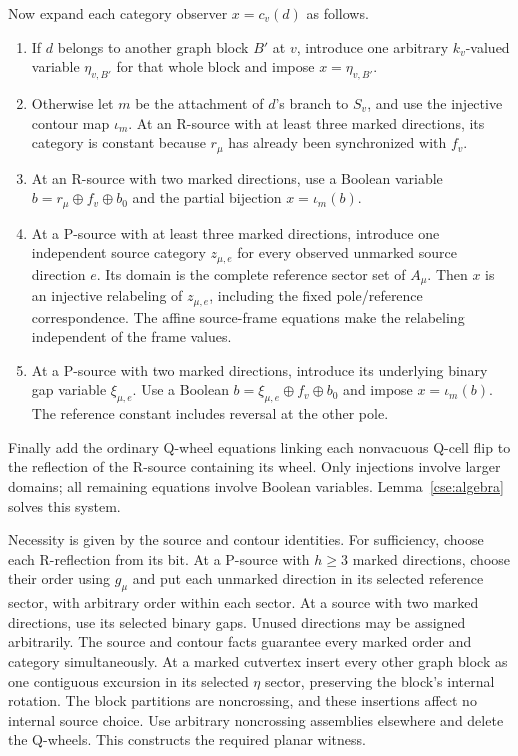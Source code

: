Now expand each category observer $x=c_v(d)$ as follows.
\begin{enumerate}
\item If $d$ belongs to another graph block $B'$ at $v$, introduce one
      arbitrary $k_v$-valued variable $\eta_{v,B'}$ for that whole block
      and impose $x=\eta_{v,B'}$.
\item Otherwise let $m$ be the attachment of $d$'s branch to $S_v$, and
      use the injective contour map $\iota_m$.
      At an R-source with at least three marked directions, its category
      is constant because $r_\mu$ has already been synchronized with
      $f_v$.
\item At an R-source with two marked directions, use a Boolean variable
      $b=r_\mu\oplus f_v\oplus b_0$ and the partial bijection
      $x=\iota_m(b)$.
\item At a P-source with at least three marked directions, introduce one
      independent source category $z_{\mu,e}$ for every observed
      unmarked source direction $e$. Its domain is the complete reference
      sector set of $A_\mu$. Then $x$ is an injective relabeling of
      $z_{\mu,e}$, including the fixed pole/reference correspondence.
      The affine source-frame equations make the relabeling independent
      of the frame values.
\item At a P-source with two marked directions, introduce its underlying
      binary gap variable $\xi_{\mu,e}$. Use a Boolean
      $b=\xi_{\mu,e}\oplus f_v\oplus b_0$ and impose
      $x=\iota_m(b)$. The reference constant includes reversal at the
      other pole.
\end{enumerate}
Finally add the ordinary Q-wheel equations linking each nonvacuous
Q-cell flip to the reflection of the R-source containing its wheel.
Only injections involve larger domains; all remaining equations involve
Boolean variables. Lemma~\ref{cse:algebra} solves this system.

Necessity is given by the source and contour identities. For sufficiency,
choose each R-reflection from its bit. At a P-source with $h\ge3$ marked
directions, choose their order using $g_\mu$ and put each unmarked
direction in its selected reference sector, with arbitrary order within
each sector. At a source with two marked directions, use its selected
binary gaps. Unused directions may be assigned arbitrarily. The source
and contour facts guarantee every marked order and category
simultaneously. At a marked cutvertex insert every other graph block as
one contiguous excursion in its selected $\eta$ sector, preserving the
block's internal rotation. The block partitions are noncrossing, and
these insertions affect no internal source choice. Use arbitrary
noncrossing assemblies elsewhere and delete the Q-wheels. This constructs
the required planar witness.

